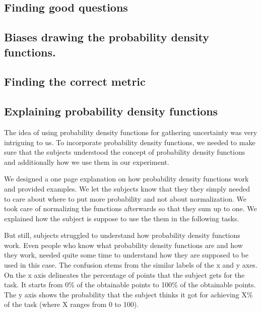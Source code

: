 \documentclass[../main/main.tex]{subfiles}
\begin{document}
	
	\subsection{Finding good questions}
	\subsection{Biases drawing the probability density functions.}
	
	\subsection{Finding the correct metric}
	
	
	
	\subsection{Explaining probability density functions}
	
	The idea of using probability density functions for gathering uncertainty was very intriguing to us. To incorporate probability density functions, we needed to make sure that the subjects understood the concept of probability density functions and additionally how we use them in our experiment. 
	
	We designed a one page explanation on how probability density functions work and provided examples. We let the subjects know that they they simply needed to care about where to put more probability and not about normalization. We took care of normalizing the functions afterwards so that they sum up to one. We explained how the subject is suppose to use the them in the following tasks.
	
	But still, subjects struggled to understand how probability density functions work. Even people who know what probability density functions are and how they work, needed quite some time to understand how they are supposed to be used in this case. The confusion stems from the similar labels of the x and y axes. On the x axis delineates the percentage of points that the subject gets for the task. It starts from 0\% of the obtainable points to 100\% of the obtainable points. The y axis shows the probability that the subject thinks it got for achieving X\% of the task (where X ranges from 0 to 100).
	
\end{document}
